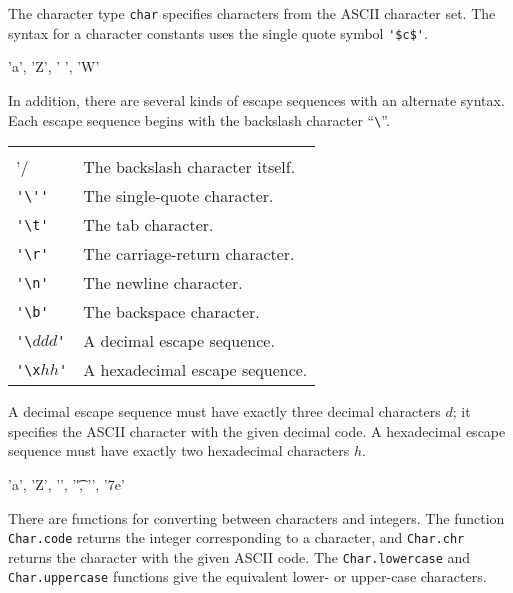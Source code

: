 \label{literal:char}

The character type \hbox{\lstinline/char/} specifies characters from the ASCII
character set.  The syntax for a character constants uses the single
quote symbol \hbox{\lstinline/'$c$'/}.

\begin{ocaml}
'a', 'Z', ' ', 'W'
\end{ocaml}
%
In addition, there are several kinds of escape sequences with an alternate syntax.
Each escape sequence begins with the backslash character ``\hbox{\lstinline/\/}''.

\begin{center}
\begin{tabular}{@{}ll@{}}
\hbox{\hbox{\lstinline/'\\'/}} & The backslash character itself.\\
\hbox{\hbox{\lstinline/'\''/}} & The single-quote character.\\
\hbox{\hbox{\lstinline/'\t'/}} & The tab character.\\
\hbox{\hbox{\lstinline/'\r'/}} & The carriage-return character.\\
\hbox{\hbox{\lstinline/'\n'/}} & The newline character.\\
\hbox{\hbox{\lstinline/'\b'/}} & The backspace character.\\
\hbox{\hbox{\lstinline/'\/}}$ddd$\hbox{\lstinline/'/} & A decimal escape sequence.\\
\hbox{\hbox{\lstinline/'\x/}}$hh$\hbox{\lstinline/'/} & A hexadecimal escape sequence.
\end{tabular}
\end{center}
%
A decimal escape sequence must have exactly three decimal characters
$d$; it specifies the ASCII character with the given decimal
code.  A hexadecimal escape sequence must have exactly two hexadecimal
characters $h$.

\begin{ocaml}
'a', 'Z', '', '\t', '\n', '\x7e'
\end{ocaml}
%
There are functions for converting between characters and integers.
The function
\hbox{\hbox{\lstinline/Char.code/}} returns the
integer corresponding to a character,
and
\hbox{\lstinline/Char.chr/} returns the character with the
given ASCII code.  The
\hbox{\lstinline/Char.lowercase/} and
\hbox{\lstinline/Char.uppercase/} functions give the equivalent
lower- or upper-case characters.

